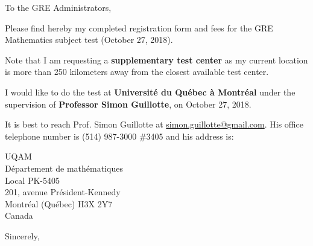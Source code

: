 \documentclass[12pt]{letter}
\date{\today}
\begin{document}
\begin{letter}{To the GRE Administrators,}
 

\opening{}

Please find hereby my completed registration form and fees for the GRE Mathematics subject test (October 27, 2018).

Note that I am requesting a \textbf{supplementary test center} as my current location is more than 250 kilometers away from the closest available test center.

I would like to do the test at \textbf{Université du Québec à Montréal} under the supervision of \textbf{Professor Simon Guillotte}, on October 27, 2018.

It is best to reach Prof. Simon Guillotte at \url{simon.guillotte@gmail.com}. His office telephone number is (514) 987-3000 \#3405 and his address is:

UQAM\\
Département de mathématiques\\
Local PK-5405\\
201, avenue Président-Kennedy\\
Montréal (Québec) H3X 2Y7\\
Canada\\

\closing{Sincerely,}

\end{letter}
\end{document}
